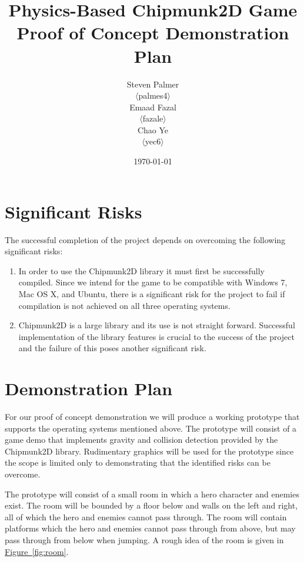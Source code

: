 \documentclass[12pt, titlepage]{article}
\begin{document}
\title{\bf Physics-Based Chipmunk2D Game\\[\baselineskip]\Large Proof of Concept Demonstration Plan}
\author{Steven Palmer\\$\langle$palmes4$\rangle$\\Emaad Fazal\\$\langle$fazale$\rangle$\\Chao Ye\\$\langle$yec6$\rangle$}
\date{\today}
	
\maketitle

\section*{Significant Risks}
The successful completion of the project depends on overcoming the following significant risks:
\begin{enumerate}
  \item In order to use the Chipmunk2D library it must first be successfully compiled.  Since we intend for the game to be compatible with Windows 7, Mac OS X, and Ubuntu, there is a significant risk for the project to fail if compilation is not achieved on all three operating systems.
  \item Chipmunk2D is a large library and its use is not straight forward.  Successful implementation of the library features is crucial to the success of the project and the failure of this poses another significant risk.
\end{enumerate}


\section*{Demonstration Plan}

For our proof of concept demonstration we will produce a working prototype that supports the operating systems mentioned above.  The prototype will consist of a game demo that implements gravity and collision detection provided by the Chipmunk2D library.  Rudimentary graphics will be used for the prototype since the scope is limited only to demonstrating that the identified risks can be overcome.

The prototype will consist of a small room in which a hero character and enemies exist.  The room will be bounded by a floor below and walls on the left and right, all of which the hero and enemies cannot pass through.  The room will contain platforms which the hero and enemies cannot pass through from above, but may pass through from below when jumping.  A rough idea of the room is given in \hyperref[fig:room]{Figure~\ref*{fig:room}}.
\end{document}
